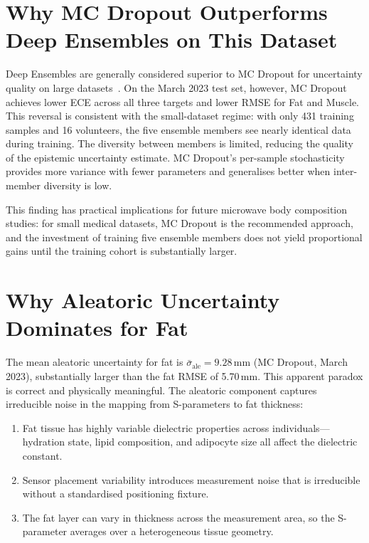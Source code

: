 \documentclass[12pt, a4paper, oneside]{report}
\begin{document}
\section{Why MC Dropout Outperforms Deep Ensembles on This Dataset}
\label{sec:mc_vs_ensemble}

Deep Ensembles are generally considered superior to MC Dropout for uncertainty quality on large datasets~\cite{lakshminarayanan2017,ovadia2019}. On the March 2023 test set, however, MC Dropout achieves lower ECE across all three targets and lower RMSE for Fat and Muscle. This reversal is consistent with the small-dataset regime: with only 431 training samples and 16 volunteers, the five ensemble members see nearly identical data during training. The diversity between members is limited, reducing the quality of the epistemic uncertainty estimate. MC Dropout's per-sample stochasticity provides more variance with fewer parameters and generalises better when inter-member diversity is low.

This finding has practical implications for future microwave body composition studies: for small medical datasets, MC Dropout is the recommended approach, and the investment of training five ensemble members does not yield proportional gains until the training cohort is substantially larger.

\section{Why Aleatoric Uncertainty Dominates for Fat}

The mean aleatoric uncertainty for fat is $\bar\sigma_{\mathrm{ale}} = 9.28$\,mm (MC Dropout, March 2023), substantially larger than the fat RMSE of 5.70\,mm. This apparent paradox is correct and physically meaningful. The aleatoric component captures irreducible noise in the mapping from S-parameters to fat thickness:

\begin{enumerate}[noitemsep]
  \item Fat tissue has highly variable dielectric properties across individuals---hydration state, lipid composition, and adipocyte size all affect the dielectric constant.
  \item Sensor placement variability introduces measurement noise that is irreducible without a standardised positioning fixture.
  \item The fat layer can vary in thickness across the measurement area, so the S-parameter averages over a heterogeneous tissue geometry.
\end{enumerate}
\end{document}
